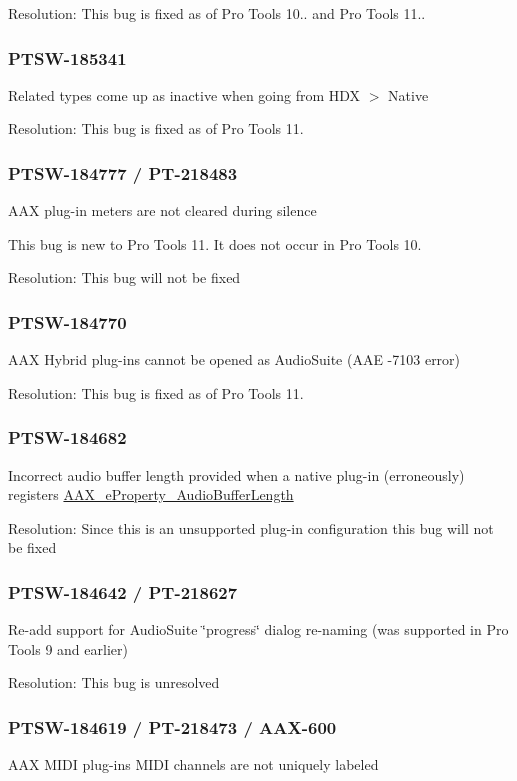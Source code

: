 Resolution\+: This bug is fixed as of Pro Tools 10.. and Pro Tools 11..\hypertarget{a00846_PTSW-185341}{}\subsubsection{P\+T\+S\+W-\/185341}\label{a00846_PTSW-185341}
Related types come up as inactive when going from H\+DX $>$ Native

Resolution\+: This bug is fixed as of Pro Tools 11.\hypertarget{a00846_PTSW-184777}{}\subsubsection{P\+T\+S\+W-\/184777 / P\+T-\/218483}\label{a00846_PTSW-184777}
A\+AX plug-\/in meters are not cleared during silence

This bug is new to Pro Tools 11. It does not occur in Pro Tools 10.

Resolution\+: This bug will not be fixed\hypertarget{a00846_PTSW-184770}{}\subsubsection{P\+T\+S\+W-\/184770}\label{a00846_PTSW-184770}
A\+AX Hybrid plug-\/ins cannot be opened as Audio\+Suite (A\+AE -\/7103 error)

Resolution\+: This bug is fixed as of Pro Tools 11.\hypertarget{a00846_PTSW-184682}{}\subsubsection{P\+T\+S\+W-\/184682}\label{a00846_PTSW-184682}
Incorrect audio buffer length provided when a native plug-\/in (erroneously) registers \mbox{\hyperlink{a00662_a13e384f22825afd3db6d68395b79ce0da34b1ae8c8edd3080aee6cd677bed9611}{A\+A\+X\+\_\+e\+Property\+\_\+\+Audio\+Buffer\+Length}}

Resolution\+: Since this is an unsupported plug-\/in configuration this bug will not be fixed\hypertarget{a00846_PTSW-184642}{}\subsubsection{P\+T\+S\+W-\/184642 / P\+T-\/218627}\label{a00846_PTSW-184642}
Re-\/add support for Audio\+Suite \char`\"{}progress\char`\"{} dialog re-\/naming (was supported in Pro Tools 9 and earlier)

Resolution\+: This bug is unresolved\hypertarget{a00846_PTSW-184619}{}\subsubsection{P\+T\+S\+W-\/184619 / P\+T-\/218473 / A\+A\+X-\/600}\label{a00846_PTSW-184619}
A\+AX M\+I\+DI plug-\/ins\textquotesingle{} M\+I\+DI channels are not uniquely labeled

